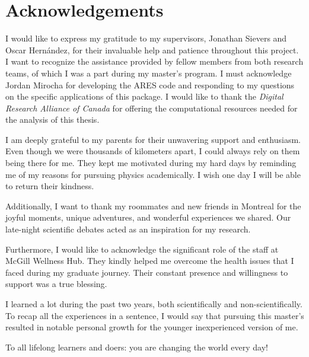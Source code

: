 \documentclass[12pt, TexShade, letterpaper]{report}
\begin{document}
\chapter*{Acknowledgements}
	\label{chap:acknowledgments}
I would like to express my gratitude to my supervisors, Jonathan Sievers and Oscar Hernández, for their invaluable help and patience throughout this project. I want to recognize the assistance provided by fellow members from both research teams, of which I was a part during my master's program. I must acknowledge Jordan Mirocha for developing the ARES code and responding to my questions on the specific applications of this package. I would like to thank the \emph{Digital Research Alliance of Canada} for offering the computational resources needed for the analysis of this thesis.\par
I am deeply grateful to my parents for their unwavering support and enthusiasm. Even though we were thousands of kilometers apart, I could always rely on them being there for me. They kept me motivated during my hard days by reminding me of my reasons for pursuing physics academically. I wish one day I will be able to return their kindness.\par
Additionally, I want to thank my roommates and new friends in Montreal for the joyful moments, unique adventures, and wonderful experiences we shared. Our late-night scientific debates acted as an inspiration for my research.\par
Furthermore, I would like to acknowledge the significant role of the staff at McGill Wellness Hub. They kindly helped me overcome the health issues that I faced during my graduate journey. Their constant presence and willingness to support was a true blessing.\par
I learned a lot during the past two years, both scientifically and non-scientifically. To recap all the experiences in a sentence, I would say that pursuing this master's resulted in notable personal growth for the younger inexperienced version of me.\par

To all lifelong learners and doers: you are changing the world every day!
	\tableofcontents\thispagestyle{plain}
 \glsunsetall
	\listoffigures\thispagestyle{plain}
 \glsresetall
 \glsunsetall
	\listoftables
  \glsresetall
	\glsaddall
	\setlength\LTleft{0pt}
	\setlength\LTright{0pt}
	\setlength\glsdescwidth{0.8\hsize}
	\printglossary[title={List of Acronyms}]
\end{document}
